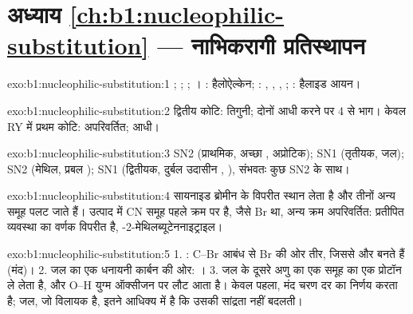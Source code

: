 \section*{अध्याय \ref{ch:b1:nucleophilic-substitution} --- नाभिकरागी प्रतिस्थापन}

\begin{solution}{exo:b1:nucleophilic-substitution:1}
; ; ;
। : हैलोऐल्केन; :
, , , ; : हैलाइड आयन।
\end{solution}

\begin{solution}{exo:b1:nucleophilic-substitution:2}
द्वितीय कोटि: तिगुनी; दोनों आधी करने पर 4 से भाग। केवल RY में प्रथम कोटि:
अपरिवर्तित; आधी।
\end{solution}

\begin{solution}{exo:b1:nucleophilic-substitution:3}
SN2 (प्राथमिक, अच्छा , अप्रोटिक); SN1 (तृतीयक, जल); SN2
(मेथिल, प्रबल ); SN1  (द्वितीयक, दुर्बल उदासीन
, ), संभवतः कुछ SN2 के साथ।
\end{solution}

\begin{solution}{exo:b1:nucleophilic-substitution:4}
सायनाइड ब्रोमीन के विपरीत स्थान लेता है और तीनों अन्य
समूह पलट जाते हैं। उत्पाद में CN समूह पहले क्रम पर है, जैसे Br था,
अन्य क्रम अपरिवर्तित: प्रतीपित व्यवस्था का वर्णक
विपरीत है, -2-मेथिलब्यूटेननाइट्राइल।
\end{solution}

\begin{solution}{exo:b1:nucleophilic-substitution:5}
1. : C--Br आबंध से Br की ओर तीर, जिससे  और
 बनते हैं (मंद)। 2. जल का एक  धनायनी कार्बन की ओर:
। 3. जल के दूसरे अणु का एक   समूह का
एक प्रोटॉन ले लेता है, और O--H युग्म ऑक्सीजन पर लौट आता है। केवल पहला,
मंद चरण दर का निर्णय करता है; जल, जो विलायक है, इतने आधिक्य में है कि
उसकी सांद्रता नहीं बदलती।
\end{solution}

